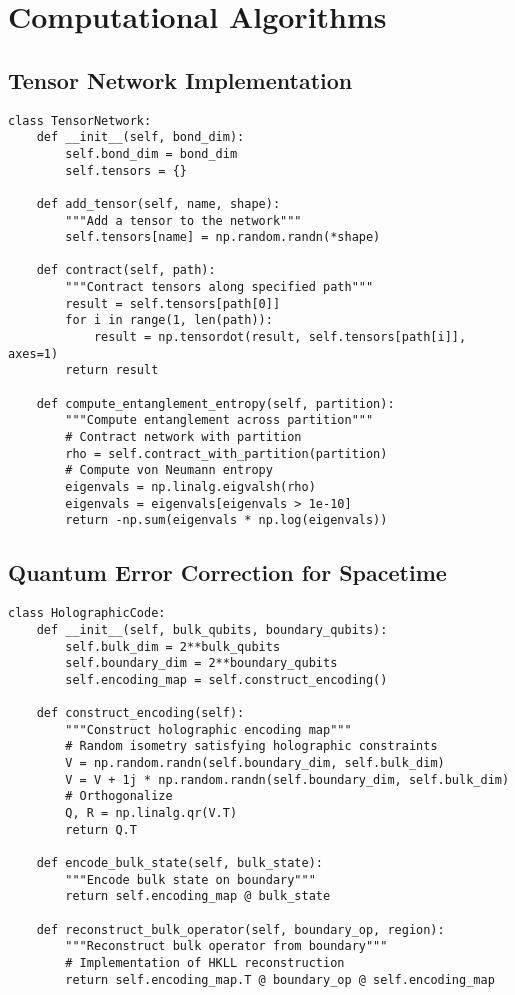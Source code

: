 \documentclass[12pt,a4paper]{article}
\begin{document}
\section{Computational Algorithms}

\subsection{Tensor Network Implementation}

\begin{lstlisting}
class TensorNetwork:
    def __init__(self, bond_dim):
        self.bond_dim = bond_dim
        self.tensors = {}
        
    def add_tensor(self, name, shape):
        """Add a tensor to the network"""
        self.tensors[name] = np.random.randn(*shape)
        
    def contract(self, path):
        """Contract tensors along specified path"""
        result = self.tensors[path[0]]
        for i in range(1, len(path)):
            result = np.tensordot(result, self.tensors[path[i]], axes=1)
        return result
    
    def compute_entanglement_entropy(self, partition):
        """Compute entanglement across partition"""
        # Contract network with partition
        rho = self.contract_with_partition(partition)
        # Compute von Neumann entropy
        eigenvals = np.linalg.eigvalsh(rho)
        eigenvals = eigenvals[eigenvals > 1e-10]
        return -np.sum(eigenvals * np.log(eigenvals))
\end{lstlisting}

\subsection{Quantum Error Correction for Spacetime}

\begin{lstlisting}
class HolographicCode:
    def __init__(self, bulk_qubits, boundary_qubits):
        self.bulk_dim = 2**bulk_qubits
        self.boundary_dim = 2**boundary_qubits
        self.encoding_map = self.construct_encoding()
        
    def construct_encoding(self):
        """Construct holographic encoding map"""
        # Random isometry satisfying holographic constraints
        V = np.random.randn(self.boundary_dim, self.bulk_dim)
        V = V + 1j * np.random.randn(self.boundary_dim, self.bulk_dim)
        # Orthogonalize
        Q, R = np.linalg.qr(V.T)
        return Q.T
        
    def encode_bulk_state(self, bulk_state):
        """Encode bulk state on boundary"""
        return self.encoding_map @ bulk_state
        
    def reconstruct_bulk_operator(self, boundary_op, region):
        """Reconstruct bulk operator from boundary"""
        # Implementation of HKLL reconstruction
        return self.encoding_map.T @ boundary_op @ self.encoding_map
\end{lstlisting}
\end{document}
